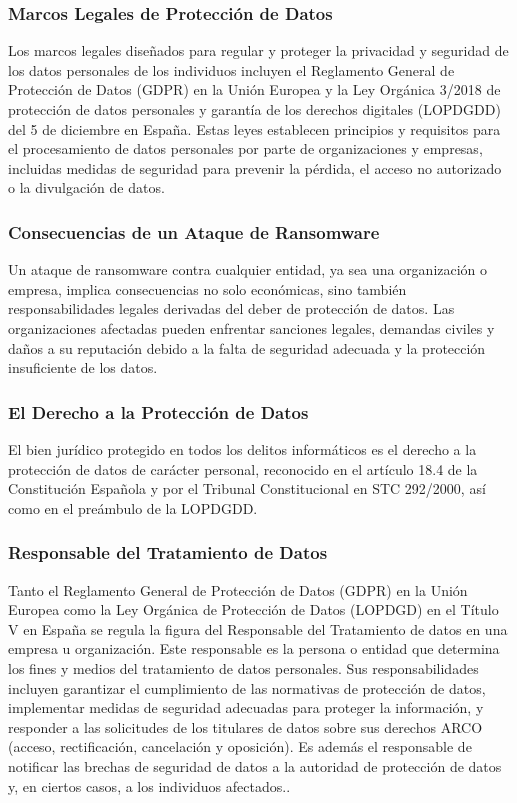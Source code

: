 \subsubsection{Marcos Legales de Protección de Datos}

Los marcos legales diseñados para regular y proteger la privacidad y seguridad de los datos personales de los individuos incluyen el Reglamento General de Protección de Datos (GDPR) en la Unión Europea y la Ley Orgánica 3/2018 de protección de datos personales y garantía de los derechos digitales (LOPDGDD) del 5 de diciembre en España. Estas leyes establecen principios y requisitos para el procesamiento de datos personales por parte de organizaciones y empresas, incluidas medidas de seguridad para prevenir la pérdida, el acceso no autorizado o la divulgación de datos.

\subsubsection{Consecuencias de un Ataque de Ransomware}

Un ataque de ransomware contra cualquier entidad, ya sea una organización o empresa, implica consecuencias no solo económicas, sino también responsabilidades legales derivadas del deber de protección de datos. Las organizaciones afectadas pueden enfrentar sanciones legales, demandas civiles y daños a su reputación debido a la falta de seguridad adecuada y la protección insuficiente de los datos.

\subsubsection{El Derecho a la Protección de Datos}

El bien jurídico protegido en todos los delitos informáticos es el derecho a la protección de datos de carácter personal, reconocido en el artículo 18.4 de la Constitución Española y por el Tribunal Constitucional en STC 292/2000, así como en el preámbulo de la LOPDGDD.

\subsubsection{Responsable del Tratamiento de Datos}

Tanto el Reglamento General de Protección de Datos (GDPR) en la Unión Europea como la Ley Orgánica de Protección de Datos (LOPDGD) en el Título V en España  se regula la figura del Responsable del Tratamiento de datos en una empresa u organización. Este responsable es la persona o entidad que determina los fines y medios del tratamiento de datos personales. Sus responsabilidades incluyen garantizar el cumplimiento de las normativas de protección de datos, implementar medidas de seguridad adecuadas para proteger la información, y responder a las solicitudes de los titulares de datos sobre sus derechos ARCO (acceso, rectificación, cancelación y oposición). Es además el responsable de notificar las brechas de seguridad de datos a la autoridad de protección de datos y, en ciertos casos, a los individuos afectados..

